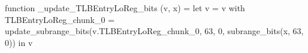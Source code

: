 function _update_TLBEntryLoReg_bits (v, x) = let v = { v with TLBEntryLoReg_chunk_0 = update_subrange_bits(v.TLBEntryLoReg_chunk_0, 63, 0, subrange_bits(x, 63, 0)) } in
  v
